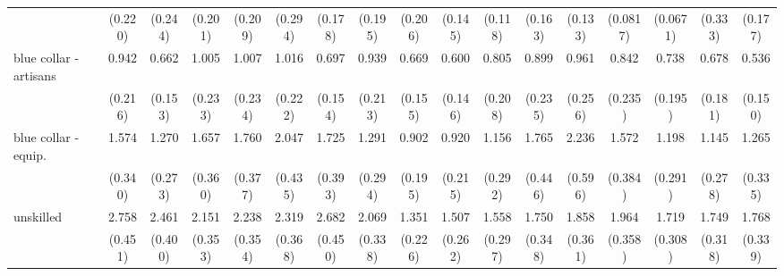 {\begin{tabular}{l*{16}{c}}
                    &     (0.220)         &     (0.244)         &     (0.201)         &     (0.209)         &     (0.294)         &     (0.178)         &     (0.195)         &     (0.206)         &     (0.145)         &     (0.118)         &     (0.163)         &     (0.133)         &    (0.0817)         &    (0.0671)         &     (0.333)         &     (0.177)         \\
[1em]
blue collar - artisans&       0.942         &       0.662         &       1.005         &       1.007         &       1.016         &       0.697         &       0.939         &       0.669         &       0.600\sym{*}  &       0.805         &       0.899         &       0.961         &       0.842         &       0.738         &       0.678         &       0.536\sym{*}  \\
                    &     (0.216)         &     (0.153)         &     (0.233)         &     (0.234)         &     (0.222)         &     (0.154)         &     (0.213)         &     (0.155)         &     (0.146)         &     (0.208)         &     (0.235)         &     (0.256)         &     (0.235)         &     (0.195)         &     (0.181)         &     (0.150)         \\
[1em]
blue collar - equip.&       1.574\sym{*}  &       1.270         &       1.657\sym{*}  &       1.760\sym{**} &       2.047\sym{***}&       1.725\sym{*}  &       1.291         &       0.902         &       0.920         &       1.156         &       1.765\sym{*}  &       2.236\sym{**} &       1.572         &       1.198         &       1.145         &       1.265         \\
                    &     (0.340)         &     (0.273)         &     (0.360)         &     (0.377)         &     (0.435)         &     (0.393)         &     (0.294)         &     (0.195)         &     (0.215)         &     (0.292)         &     (0.446)         &     (0.596)         &     (0.384)         &     (0.291)         &     (0.278)         &     (0.335)         \\
[1em]
unskilled           &       2.758\sym{***}&       2.461\sym{***}&       2.151\sym{***}&       2.238\sym{***}&       2.319\sym{***}&       2.682\sym{***}&       2.069\sym{***}&       1.351         &       1.507\sym{*}  &       1.558\sym{*}  &       1.750\sym{**} &       1.858\sym{**} &       1.964\sym{***}&       1.719\sym{**} &       1.749\sym{**} &       1.768\sym{**} \\
                    &     (0.451)         &     (0.400)         &     (0.353)         &     (0.354)         &     (0.368)         &     (0.450)         &     (0.338)         &     (0.226)         &     (0.262)         &     (0.297)         &     (0.348)         &     (0.361)         &     (0.358)         &     (0.308)         &     (0.318)         &     (0.339)         \\

\end{tabular}}

